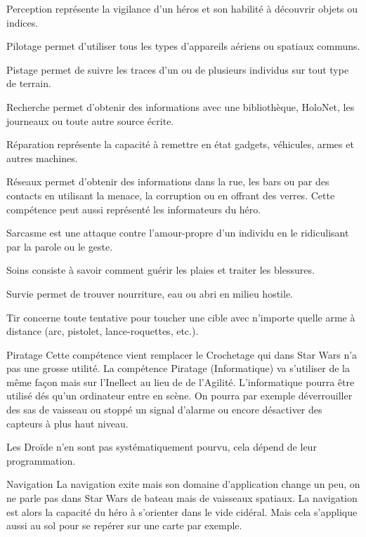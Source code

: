 \begin{description}[align=left]
	\item [Perception (Int)]
		Perception représente la vigilance d’un héros et son habilité à découvrir objets ou indices.
	\item [Pilotage (Agi)]
		Pilotage permet d’utiliser tous les types d’appareils aériens ou spatiaux communs.
	\item [Pistage (Int)]
		Pistage permet de suivre les traces d’un ou de plusieurs individus sur tout type de terrain.
	\item [Recherche (Int)]
		Recherche permet d’obtenir des informations avec une bibliothèque, HoloNet, les journeaux ou toute autre source écrite.
	\item [Réparation (Int)]
		Réparation représente la capacité à remettre en état gadgets, véhicules, armes et autres machines.
	\item [Réseaux (Int)]
		Réseaux permet d’obtenir des informations dans la rue, les bars ou par des contacts en utilisant la menace, la corruption ou en offrant des verres. Cette compétence peut aussi représenté les informateurs du héro.
	\item [Sarcasme (Int)]
		Sarcasme est une attaque contre l’amour-propre d’un individu en le ridiculisant par la parole ou le geste.
	\item [Soins (Int)]
		Soins consiste à savoir comment guérir les plaies et traiter les blessures.
	\item [Survie (Int)]
		Survie permet de trouver nourriture, eau ou abri en milieu hostile.
	\item [Tir (Agi)]
		Tir concerne toute tentative pour toucher une cible avec n’importe quelle arme à distance (arc, pistolet, lance-roquettes, etc.).
\end{description}

\begin{paperbox}{Piratage}
	Cette compétence vient remplacer le Crochetage qui dans Star Wars n'a pas une grosse utilité. La compétence Piratage (Informatique) va s'utiliser de la même façon mais sur l'Inellect au lieu de de l'Agilité. L'informatique pourra être utilisé dés qu'un ordinateur entre en scène. On pourra par exemple déverrouiller des sas de vaisseau ou stoppé un signal d'alarme ou encore désactiver des capteurs à plus haut niveau.

	Les Droïde n'en sont pas systématiquement pourvu, cela dépend de leur programmation.
\end{paperbox}

\begin{paperbox}{Navigation}
	La navigation exite mais son domaine d'application change un peu, on ne parle pas dans Star Wars de bateau mais de vaisseaux spatiaux. La navigation est alors la capacité du héro à s'orienter dans le vide cidéral. Mais cela s'applique aussi au sol pour se repérer sur une carte par exemple.
\end{paperbox}

